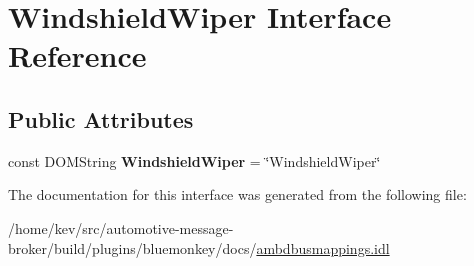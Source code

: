 \hypertarget{interfaceWindshieldWiper}{\section{Windshield\+Wiper Interface Reference}
\label{interfaceWindshieldWiper}
}
\subsection*{Public Attributes}
\begin{DoxyCompactItemize}
\item 
\hypertarget{interfaceWindshieldWiper_acddede91624c4e376bc5d643dafef04c}{const D\+O\+M\+String {\bfseries Windshield\+Wiper} = \char`\"{}Windshield\+Wiper\char`\"{}}\label{interfaceWindshieldWiper_acddede91624c4e376bc5d643dafef04c}

\end{DoxyCompactItemize}


The documentation for this interface was generated from the following file\+:\begin{DoxyCompactItemize}
\item 
/home/kev/src/automotive-\/message-\/broker/build/plugins/bluemonkey/docs/\hyperlink{ambdbusmappings_8idl}{ambdbusmappings.\+idl}\end{DoxyCompactItemize}

